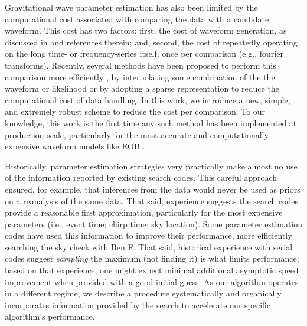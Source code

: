 \documentclass[twocolumn,prd,nofootinbib]{revtex4}
\newcommand\editremark[1]{{\color{red} #1}}
\begin{document}
Gravitational wave parameter estimation has also been limited by the computational cost associated with comparing the
data with a candidate waveform.  This cost has two factors: first, the cost of waveform generation, as discussed in
\cite{gwastro-mergers-PE-ReducedOrder-2013,2013PhRvD..87l2002S,2013PhRvD..87d4008C,gwastro-mergers-IMRPhenomP,gwastro-SpinTaylorF2-2013} and references therein; and, second,
the cost of repeatedly operating on the long time- or frequency-series itself, once per comparison (e.g., fourier
transforms).   
%
Recently, several methods have been proposed to perform this comparison more efficiently
\cite{gwastro-mergers-PE-ReducedOrder-2013,2013PhRvD..87l2002S,2013PhRvD..87d4008C,gw-astro-ReducedOrderQuadraturePE-TiglioEtAl2014}, by interpolating some combination
of the the waveform or likelihood or by adopting a sparse representation to reduce the computational cost of data
handling.  
%
In this work, we introduce a new, simple, and extremely robust scheme to reduce the cost per comparison.  
%
To our knowledge, this work is the first time any such method has been implemented at production scale, particularly for
the most accurate and computationally-expensive waveform models like EOB
\cite{gw-astro-EOBspin-Tarrachini2012,gw-astro-EOBNR-Calibrated-2009}.  


Historically, parameter estimation strategies very practically make almost no use of the information reported by
existing search codes.  This careful approach ensured, for example, that inferences from the data would never be used as priors on a
reanalysis of the same data.  
%
That said, experience suggests the search codes provide a reasonable first approximation, 
particularly for the most expensive parameters (i.e., event time; chirp time; sky location).  
%
Some parameter estimation codes have used this information to improve their performance, more efficiently searching the
sky \editremark{check with Ben F}.  
That said, historical experience with serial codes suggest \emph{sampling} the maximum (not finding it) is what limits
performance; based on that experience, one might expect minimal additional asymptotic speed improvement when provided
with a good initial guess.
%
As our algorithm operates in a different regime,  we describe a procedure systematically and organically incorporates information provided
by the search to accelerate our specific algorithm's performance.  
\end{document}
